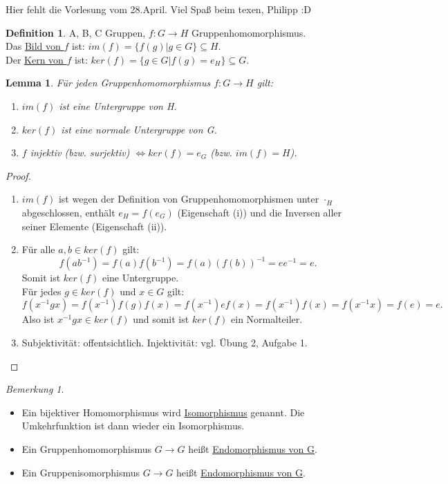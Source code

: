 \documentclass[12pt]{scrartcl}%
\newtheorem{lemma}{Lemma}
\theoremstyle{definition}
\newtheorem*{defn}{Definition}
\theoremstyle{remark}
\newtheorem*{nb}{Bemerkung}
\begin{document}

\newpage
\thispagestyle{empty}
Hier fehlt die Vorlesung vom 28.April. Viel Spaß beim texen, Philipp :D

\newpage





\begin{defn}
	A, B, C Gruppen, $ f: G \rightarrow H$ Gruppenhomomorphismus. \\
	Das \underline{Bild von $f$} ist: $im(f) = \{f(g) | g \in G\} \subseteq H$. \\
	Der \underline{Kern von $f$} ist: $ker(f) = \{g \in G | f(g) = e_H\} \subseteq G$.
\end{defn}

\begin{lemma}
	Für jeden Gruppenhomomorphismus $ f: G \rightarrow H$ gilt:
	\begin{enumerate}[label=(\roman*)]
		\item $im(f)$ ist eine Untergruppe von H.
		\item $ker(f)$ ist eine normale Untergruppe von G.
		\item $f$ injektiv (bzw. surjektiv) $ \Leftrightarrow ker(f) = {e_G}$ (bzw. $im(f) = H$).
	\end{enumerate}
\end{lemma}

\begin{proof}
	\begin{enumerate}[label=(\roman*)]
		\item $im(f)$ ist wegen der Definition von Gruppenhomomorphismen unter $\cdot_H$ abgeschlossen, enthält $e_H = f(e_G)$ (Eigenschaft (i)) und die Inversen aller seiner Elemente (Eigenschaft (ii)).
		\item Für alle $a, b \in ker(f)$ gilt:
			$$ f(ab^{-1}) = f(a)f(b^{-1}) = f(a)(f(b))^{-1} = ee^{-1} = e.$$
			Somit ist $ker(f)$ eine Untergruppe. \\
			Für jedes $ g \in ker(f)$ und $x \in G$ gilt:
			$$ f(x^{-1}gx) = f(x^{-1})f(g)f(x) = f(x^{-1}) e f(x) = f(x^{-1})f(x) = f(x^{-1}x) = f(e) = e.$$
			Also ist $x^{-1}gx \in ker(f) $ und somit ist $ker(f)$ ein Normalteiler.
		\item Subjektivität: offentsichtlich. Injektivität: vgl. Übung 2, Aufgabe 1.
	\end{enumerate}	
\end{proof}

\begin{nb}
	\begin{itemize}
		\item Ein bijektiver Homomorphismus wird \underline{Isomorphismus} genannt. Die Umkehrfunktion ist dann wieder ein Isomorphismus.
		\item Ein Gruppenhomomorphismus $G \rightarrow G$ heißt \underline{Endomorphismus von G}.
		\item Ein Gruppenisomorphismus $G \rightarrow G$ heißt \underline{Endomorphismus von G}.
	\end{itemize}
\end{nb}
\end{document}
